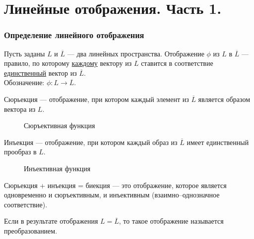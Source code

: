 \part{Линейные отображения. Часть 1.}
\section{Определение линейного отображения}
\begin{definition}
	Пусть заданы $L$ и $\overline{L}$ --- два линейных пространства. \textsf{Отображение} $\phi$ из $L$ в $\overline{L}$ --- правило, по которому \underline{каждому} вектору из $L$ ставится в соответствие \underline{единственный} вектор из $\overline{L}$.\\
	Обозначение: $\phi: L\rightarrow\overline{L}$.
\end{definition}

\begin{definition}
	\textsf{Сюрьекция} --- отображение, при котором каждый элемент из $\overline{L}$ является образом вектора из $L$.
\end{definition}

\begin{figure}[h!]
	\centering
	\def\svgwidth{5cm} %
	
	\caption{Сюръективная функция}
	\label{...}
\end{figure}

\begin{definition}
	\textsf{Инъекция} --- отображение, при котором каждый образ из $\overline{L}$ имеет единственный прообраз в $L$.
\end{definition}

\begin{figure}[h!]
	\centering
	\def\svgwidth{5cm} %
	
	\caption{Инъективная функция}
	\label{...}
\end{figure}

\begin{definition}
	Сюрьекция + инъекция = \textsf{биекция} --- это отображение, которое является одновременно и сюръективным, и инъективным (взаимно--однозначное соответствие).
\end{definition}

\begin{definition}
	Если в результате отображения $L=\overline{L}$, то такое отображение называется \textsf{преобразованием}.
\end{definition}

